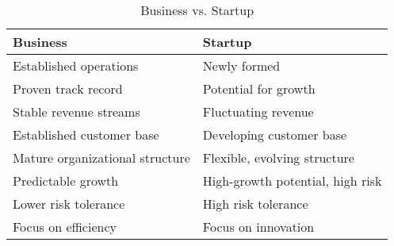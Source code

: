 

\begin{table}[h]
\centering
\begin{tabular}{|l|l|}
\hline
\textbf{Business} & \textbf{Startup} \\ \hline
Established operations & Newly formed \\ \hline
Proven track record & Potential for growth \\ \hline
Stable revenue streams & Fluctuating revenue \\ \hline
Established customer base & Developing customer base \\ \hline
Mature organizational structure & Flexible, evolving structure \\ \hline
Predictable growth & High-growth potential, high risk \\ \hline
Lower risk tolerance & High risk tolerance \\ \hline
Focus on efficiency & Focus on innovation \\ \hline
\end{tabular}
\caption{Business vs. Startup}
\label{tab:business_startup}
\end{table}
